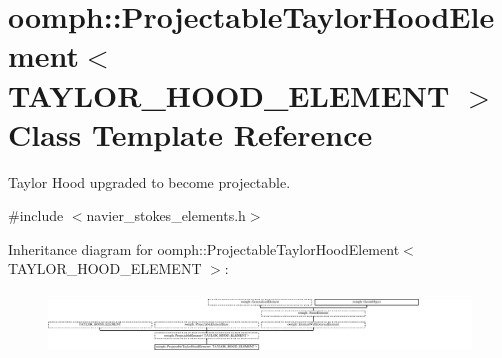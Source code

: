 \hypertarget{classoomph_1_1ProjectableTaylorHoodElement}{}\section{oomph\+:\+:Projectable\+Taylor\+Hood\+Element$<$ T\+A\+Y\+L\+O\+R\+\_\+\+H\+O\+O\+D\+\_\+\+E\+L\+E\+M\+E\+NT $>$ Class Template Reference}
\label{classoomph_1_1ProjectableTaylorHoodElement}


Taylor Hood upgraded to become projectable.  




{\ttfamily \#include $<$navier\+\_\+stokes\+\_\+elements.\+h$>$}

Inheritance diagram for oomph\+:\+:Projectable\+Taylor\+Hood\+Element$<$ T\+A\+Y\+L\+O\+R\+\_\+\+H\+O\+O\+D\+\_\+\+E\+L\+E\+M\+E\+NT $>$\+:\begin{figure}[H]
\begin{center}
\leavevmode
\includegraphics[height=1.662708cm]{classoomph_1_1ProjectableTaylorHoodElement}
\end{center}
\end{figure}
